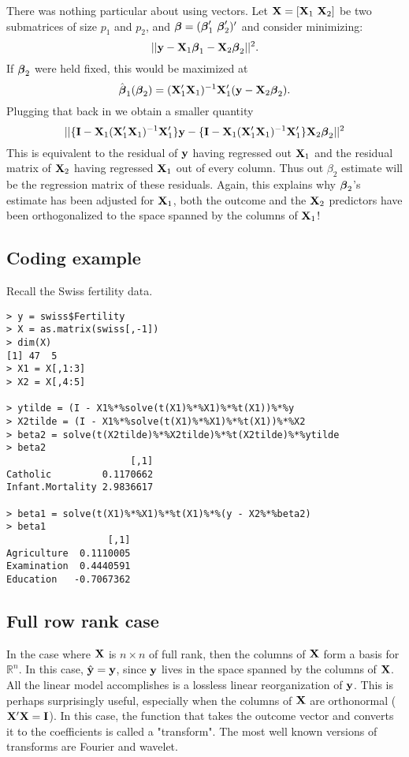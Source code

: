 There was nothing particular about using vectors.
Let $\mathbf{X} = [\mathbf{X}_1 \, \, \mathbf{X}_2]$ be two submatrices of size
$p_1$ and $p_2$, and $\boldsymbol{\beta} = (\boldsymbol{\beta}_1' \, \,  \boldsymbol{\beta}_2')'$ and consider minimizing:
$$
|| \mathbf{y} - \mathbf{X}_1 \boldsymbol{\beta}_1 - \mathbf{X}_2 \boldsymbol{\beta}_2||^2.
$$
If $\boldsymbol{\beta}_2$ were held fixed, this would be maximized
at 
$$
\hat {\boldsymbol{\beta}}_1(\boldsymbol{\beta}_2) = 
(\mathbf{X}_1' \mathbf{X}_1)^{-1} \mathbf{X}_1' (\mathbf{y} - \mathbf{X}_2 \boldsymbol{\beta}_2).
$$
Plugging that back in we obtain a smaller quantity
$$
||\{\mathbf{I} - \mathbf{X}_1(\mathbf{X}_1' \mathbf{X}_1)^{-1} \mathbf{X}_1'\} \mathbf{y}
- \{\mathbf{I} - \mathbf{X}_1(\mathbf{X}_1' \mathbf{X}_1)^{-1} \mathbf{X}_1' \}\mathbf{X}_2 \boldsymbol{\beta}_2
||^2
$$
This is equivalent to the residual of $\mathbf{y}$ having
regressed out $\mathbf{X}_1$ and the residual matrix of
$\mathbf{X}_2$ having regressed $\mathbf{X}_1$ out of every column.
Thus out $\beta_2$ estimate will be the regression
matrix of these residuals. Again, this explains
why $\boldsymbol{\beta}_2$'s estimate has been adjusted for
$\mathbf{X}_1$, both the outcome and the $\mathbf{X}_2$ predictors
have been orthogonalized to the space spanned
by the columns of $\mathbf{X}_1$!


\subsection{Coding example}
Recall the Swiss fertility data.


\begin{verbatim}
> y = swiss$Fertility
> X = as.matrix(swiss[,-1])
> dim(X)
[1] 47  5
> X1 = X[,1:3]
> X2 = X[,4:5]

> ytilde = (I - X1%*%solve(t(X1)%*%X1)%*%t(X1))%*%y
> X2tilde = (I - X1%*%solve(t(X1)%*%X1)%*%t(X1))%*%X2
> beta2 = solve(t(X2tilde)%*%X2tilde)%*%t(X2tilde)%*%ytilde
> beta2
                      [,1]
Catholic         0.1170662
Infant.Mortality 2.9836617

> beta1 = solve(t(X1)%*%X1)%*%t(X1)%*%(y - X2%*%beta2)
> beta1
                  [,1]
Agriculture  0.1110005
Examination  0.4440591
Education   -0.7067362
\end{verbatim}



\subsection{Full row rank case}

In the case where $\mathbf{X}$ is $n\times n$ of full rank,
then the columns of $\mathbf{X}$ form a basis for $\mathbb{R}^n$.
In this case, $\hat {\mathbf{y}} = \mathbf{y}$, since $\mathbf{y}$ lives
in the space spanned by the columns of $\mathbf{X}$. All
the linear model accomplishes is a lossless 
linear reorganization of $\mathbf{y}$. This is perhaps surprisingly
useful, especially when the columns of $\mathbf{X}$ are
orthonormal ($\mathbf{X}' \mathbf{X} = \mathbf{I}$). In this case, the
function that takes the outcome vector and converts
it to the coefficients is called a "transform". The
most well known versions of transforms are Fourier and
wavelet. 





